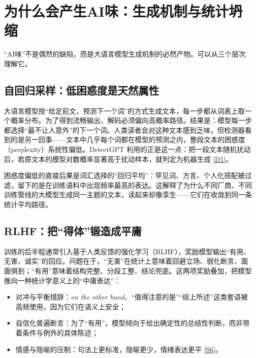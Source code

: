 \documentclass[10pt,a4paper]{ctexart}
\begin{document}
\section{为什么会产生AI味：生成机制与统计坍缩}

\begin{justifying}
“AI味”不是偶然的缺陷，而是大语言模型生成机制的必然产物。可以从三个层次理解它。

\subsection{自回归采样：低困惑度是天然属性}

大语言模型按“给定前文，预测下一个词”的方式生成文本，每一步都从词表上取一个概率分布。为了得到流畅输出，解码必须偏向高概率路径。结果是：模型每一步都选择“最不让人意外”的下一个词。人类读者会对这种文本感到乏味，但检测器看到的是另一回事——文本中几乎每个词都在模型的预测之内，整段文本的困惑度（perplexity）系统性偏低。DetectGPT 利用的正是这一点：把一段文本随机扰动后，若原文本的模型对数概率显著高于扰动样本，就判定为机器生成 \href{https://arxiv.org/abs/2301.11305}{[D1]}。

困惑度偏低的直接后果是词汇选择的“回归平均”：罕见词、方言、个人化搭配被过滤，留下的是在训练语料中出现频率最高的表达。这解释了为什么不同厂商、不同训练管线的大模型生成同一主题的文本，读起来却像孪生——它们在收敛到同一条统计平均路径。

\subsection{RLHF：把“得体”锻造成平庸}

训练的后半程通常引入基于人类反馈的强化学习（RLHF），奖励模型输出“有用、无害、诚实”的回应。问题在于，“无害”在统计上意味着回避立场、弱化断言、面面俱到；“有用”意味着结构完整、分段工整、结论兜底。这两项奖励叠加，把模型推向一种统计学意义上的“中庸表达”：

\begin{itemize}[leftmargin=2em,itemsep=1pt]
\item 对冲与平衡措辞：\textit{on the other hand}、“值得注意的是”“综上所述”这类套语被高频使用，因为它们在语义上安全；
\item 自信化普遍断言：为了“有用”，模型倾向于给出确定性的总结性判断，而非带着条件与例外的具体陈述；
\item 情感与隐喻的压制：句法上更标准，隐喻更少，情绪表达更平 \href{https://hispadoc.es/descarga/articulo/10651021.pdf}{[S6]}。
\end{itemize}


\end{justifying}
\end{document}
